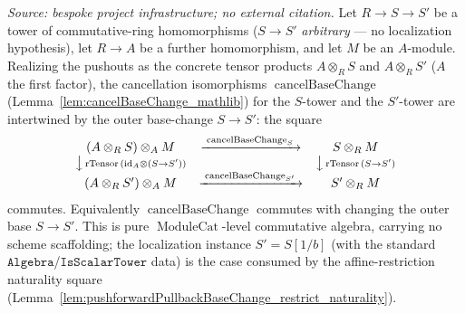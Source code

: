 \begin{lemma}\leanok
  \label{lem:cancelBaseChange_localization_compat}
  \textit{Source: bespoke project infrastructure; no external citation.}
  Let \(R \to S \to S'\) be a tower of commutative-ring homomorphisms (\(S \to S'\)
  \emph{arbitrary} --- no localization hypothesis), let \(R \to A\) be a further homomorphism, and
  let \(M\) be an \(A\)-module. Realizing the pushouts as the concrete tensor products
  \(A \otimes_R S\) and \(A \otimes_R S'\) (\(A\) the first factor), the cancellation
  isomorphisms \(\operatorname{cancelBaseChange}\) (Lemma~\ref{lem:cancelBaseChange_mathlib}) for the
  \(S\)-tower and the \(S'\)-tower are intertwined by the outer base-change \(S \to S'\): the square
  \[
    \begin{array}{ccc}
      (A \otimes_R S) \otimes_A M & \xrightarrow{\;\operatorname{cancelBaseChange}_S\;} & S \otimes_R M\\
      \big\downarrow{\scriptstyle\,\mathrm{rTensor}\,(\mathrm{id}_A \otimes (S\to S'))} & & \big\downarrow{\scriptstyle\,\mathrm{rTensor}\,(S \to S')}\\
      (A \otimes_R S') \otimes_A M & \xrightarrow{\;\operatorname{cancelBaseChange}_{S'}\;} & S' \otimes_R M
    \end{array}
  \]
  commutes. Equivalently \(\operatorname{cancelBaseChange}\) commutes with changing the outer base
  \(S \to S'\). This is pure \(\operatorname{ModuleCat}\)-level commutative algebra, carrying no
  scheme scaffolding; the localization instance \(S' = S[1/b]\) (with the standard
  \(\mathtt{Algebra}\)/\(\mathtt{IsScalarTower}\) data) is the case consumed by the
  affine-restriction naturality square
  (Lemma~\ref{lem:pushforwardPullbackBaseChange_restrict_naturality}).
\end{lemma}

